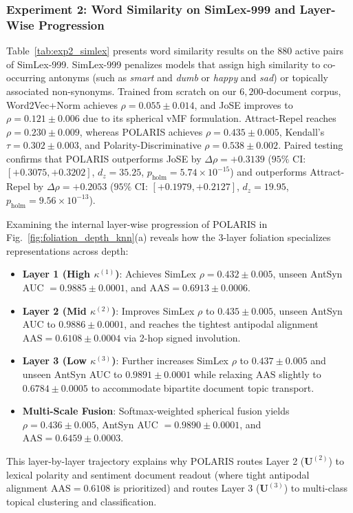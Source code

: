 \documentclass[journal]{IEEEtran}
\begin{document}
\subsubsection{Experiment 2: Word Similarity on SimLex-999 and Layer-Wise Progression}
Table~\ref{tab:exp2_simlex} presents word similarity results on the $880$ active pairs of SimLex-999. SimLex-999 penalizes models that assign high similarity to co-occurring antonyms (such as \textit{smart} and \textit{dumb} or \textit{happy} and \textit{sad}) or topically associated non-synonyms. Trained from scratch on our $6,200$-document corpus, Word2Vec+Norm achieves $\rho = 0.055 \pm 0.014$, and JoSE improves to $\rho = 0.121 \pm 0.006$ due to its spherical vMF formulation. Attract-Repel reaches $\rho = 0.230 \pm 0.009$, whereas POLARIS achieves $\rho = 0.435 \pm 0.005$, Kendall's $\tau = 0.302 \pm 0.003$, and Polarity-Discriminative $\rho = 0.538 \pm 0.002$. Paired testing confirms that POLARIS outperforms JoSE by $\Delta\rho = +0.3139$ ($95\%$ CI: $[+0.3075, +0.3202]$, $d_z = 35.25$, $p_{\text{holm}} = 5.74 \times 10^{-15}$) and outperforms Attract-Repel by $\Delta\rho = +0.2053$ ($95\%$ CI: $[+0.1979, +0.2127]$, $d_z = 19.95$, $p_{\text{holm}} = 9.56 \times 10^{-13}$).

Examining the internal layer-wise progression of POLARIS in Fig.~\ref{fig:foliation_depth_knn}(a) reveals how the 3-layer foliation specializes representations across depth:
\begin{itemize}
    \item \textbf{Layer 1 (High $\kappa^{(1)}$)}: Achieves SimLex $\rho = 0.432 \pm 0.005$, unseen AntSyn AUC $= 0.9885 \pm 0.0001$, and $\text{AAS} = 0.6913 \pm 0.0006$.
    \item \textbf{Layer 2 (Mid $\kappa^{(2)}$)}: Improves SimLex $\rho$ to $0.435 \pm 0.005$, unseen AntSyn AUC to $0.9886 \pm 0.0001$, and reaches the tightest antipodal alignment $\text{AAS} = 0.6108 \pm 0.0004$ via 2-hop signed involution.
    \item \textbf{Layer 3 (Low $\kappa^{(3)}$)}: Further increases SimLex $\rho$ to $0.437 \pm 0.005$ and unseen AntSyn AUC to $0.9891 \pm 0.0001$ while relaxing $\text{AAS}$ slightly to $0.6784 \pm 0.0005$ to accommodate bipartite document topic transport.
    \item \textbf{Multi-Scale Fusion}: Softmax-weighted spherical fusion yields $\rho = 0.436 \pm 0.005$, AntSyn AUC $= 0.9890 \pm 0.0001$, and $\text{AAS} = 0.6459 \pm 0.0003$.
\end{itemize}
This layer-by-layer trajectory explains why POLARIS routes Layer 2 ($\mathbf{U}^{(2)}$) to lexical polarity and sentiment document readout (where tight antipodal alignment $\text{AAS} = 0.6108$ is prioritized) and routes Layer 3 ($\mathbf{U}^{(3)}$) to multi-class topical clustering and classification.
\end{document}
